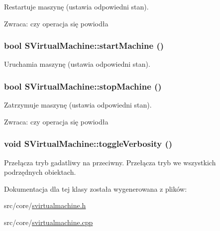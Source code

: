 Restartuje maszynę (ustawia odpowiedni stan). \begin{Desc}
\item[Zwraca:]czy operacja się powiodła \end{Desc}
\hypertarget{classSVirtualMachine_49e93dd25b48a8dbba896f9b2964c526}{
\subsubsection[{startMachine}]{\setlength{\rightskip}{0pt plus 5cm}bool SVirtualMachine::startMachine ()}}
\label{classSVirtualMachine_49e93dd25b48a8dbba896f9b2964c526}


Uruchamia maszynę (ustawia odpowiedni stan). \hypertarget{classSVirtualMachine_81211b6ef712dbc4a147d7fa86aed440}{
\subsubsection[{stopMachine}]{\setlength{\rightskip}{0pt plus 5cm}bool SVirtualMachine::stopMachine ()}}
\label{classSVirtualMachine_81211b6ef712dbc4a147d7fa86aed440}


Zatrzymuje maszynę (ustawia odpowiedni stan). \begin{Desc}
\item[Zwraca:]czy operacja się powiodła \end{Desc}
\hypertarget{classSVirtualMachine_d099907121223d24b1a599a3518cf3b0}{
\subsubsection[{toggleVerbosity}]{\setlength{\rightskip}{0pt plus 5cm}void SVirtualMachine::toggleVerbosity ()}}
\label{classSVirtualMachine_d099907121223d24b1a599a3518cf3b0}


Przełącza tryb gadatliwy na przeciwny. Przełącza tryb we wszystkich podrzędnych obiektach. 

Dokumentacja dla tej klasy została wygenerowana z plików:\begin{CompactItemize}
\item 
src/core/\hyperlink{svirtualmachine_8h}{svirtualmachine.h}\item 
src/core/\hyperlink{svirtualmachine_8cpp}{svirtualmachine.cpp}\end{CompactItemize}
